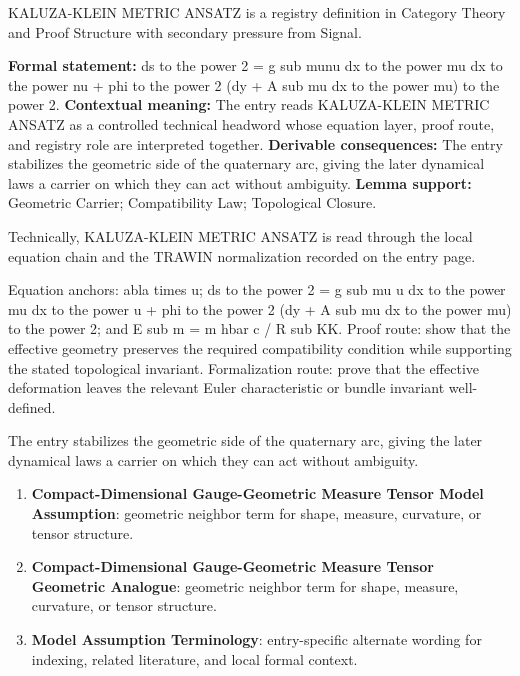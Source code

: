 
\begingroup\small
{}
KALUZA-KLEIN METRIC ANSATZ is a registry definition in Category Theory and Proof Structure with secondary pressure from Signal.

\begingroup\footnotesize\setlength{\emergencystretch}{3em}\sloppy
\textbf{Formal statement:} ds to the power 2 = g sub munu dx to the power mu dx to the power nu + phi to the power 2 (dy + A sub mu dx to the power mu) to the power 2. \textbf{Contextual meaning:} The entry reads KALUZA-KLEIN METRIC ANSATZ as a controlled technical headword whose equation layer, proof route, and registry role are interpreted together. \textbf{Derivable consequences:} The entry stabilizes the geometric side of the quaternary arc, giving the later dynamical laws a carrier on which they can act without ambiguity. \textbf{Lemma support:} Geometric Carrier; Compatibility Law; Topological Closure.\par
\endgroup

Technically, KALUZA-KLEIN METRIC ANSATZ is read through the local equation chain and the TRAWIN normalization recorded on the entry page.

Equation anchors: abla times u; ds to the power 2 = g sub mu u dx to the power mu dx to the power u + phi to the power 2 (dy + A sub mu dx to the power mu) to the power 2; and E sub m = m hbar c / R sub KK. Proof route: show that the effective geometry preserves the required compatibility condition while supporting the stated topological invariant. Formalization route: prove that the effective deformation leaves the relevant Euler characteristic or bundle invariant well-defined.

The entry stabilizes the geometric side of the quaternary arc, giving the later dynamical laws a carrier on which they can act without ambiguity.
\endgroup

\begin{enumerate}[leftmargin=1.6em,itemsep=6pt,topsep=4pt]
\item \textbf{Compact-Dimensional Gauge-Geometric Measure Tensor Model Assumption}: geometric neighbor term for shape, measure, curvature, or tensor structure.
\item \textbf{Compact-Dimensional Gauge-Geometric Measure Tensor Geometric Analogue}: geometric neighbor term for shape, measure, curvature, or tensor structure.
\item \textbf{Model Assumption Terminology}: entry-specific alternate wording for indexing, related literature, and local formal context.
\end{enumerate}

